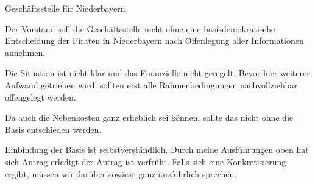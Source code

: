 \documentclass{protokoll}
\begin{document}
\begin{Antrag}
        {Geschäftsstelle für Niederbayern}
        {\abgelehnt}


\begin{Text}
Der Vorstand soll die Geschäftsstelle nicht ohne eine
basisdemokratische Entscheidung der Piraten in Niederbayern nach
Offenlegung aller Informationen annehmen.
\end{Text}

\begin{Begründung}
Die Situation ist nicht klar und das Finanzielle nicht geregelt. Bevor
hier weiterer Aufwand getrieben wird, sollten erst alle
Rahmenbedingungen nachvollziehbar offengelegt werden.

Da auch die Nebenkosten ganz erheblich sei können, sollte das nicht
ohne die Basis entschieden werden.
\end{Begründung}


    Einbindung der Basis ist selbstverständlich. Durch meine Ausführungen oben hat sich Antrag erledigt
    der Antrag ist verfrüht. Falls sich eine Konkretisierung ergibt, müssen wir darüber sowieso ganz ausführlich sprechen.

\end{Antrag}
\end{document}
